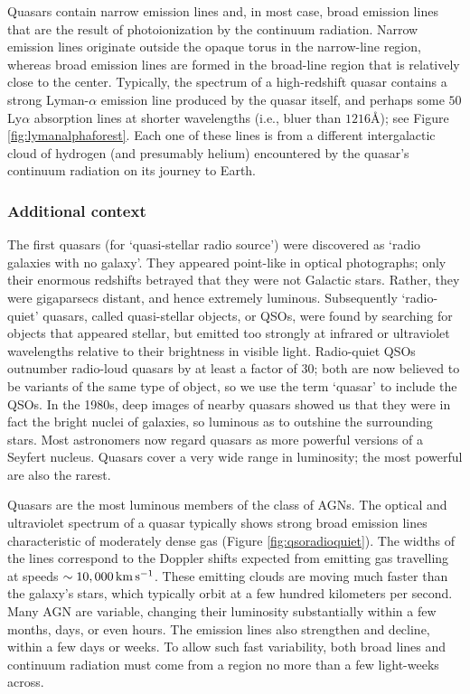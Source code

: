 \documentclass[a4paper,10pt]{article}
\begin{document}
{\noindent}Quasars contain narrow emission lines and, in most case, broad emission lines that are the result of photoionization by the continuum radiation. Narrow emission lines originate outside the opaque torus in the narrow-line region, whereas broad emission lines are formed in the broad-line region that is relatively close to the center. Typically, the spectrum of a high-redshift quasar contains a strong Lyman-$\alpha$ emission line produced by the quasar itself, and perhaps some $50$ Ly$\alpha$ absorption lines at shorter wavelengths (i.e., bluer than $1216$\AA); see Figure \ref{fig:lymanalphaforest}. Each one of these lines is from a different intergalactic cloud of hydrogen (and presumably helium) encountered by the quasar's continuum radiation on its journey to Earth.

\subsubsection{Additional context}

{\noindent}The first quasars (for `quasi-stellar radio source') were discovered as `radio galaxies with no galaxy'. They appeared point-like in optical photographs; only their enormous redshifts betrayed that they were not Galactic stars. Rather, they were gigaparsecs distant, and hence extremely luminous. Subsequently `radio-quiet' quasars, called quasi-stellar objects, or QSOs, were found by searching for objects that appeared stellar, but emitted too strongly at infrared or ultraviolet wavelengths relative to their brightness in visible light. Radio-quiet QSOs outnumber radio-loud quasars by at least a factor of 30; both are now believed to be variants of the same type of object, so we use the term `quasar' to include the QSOs. In the 1980s, deep images of nearby quasars showed us that they were in fact the bright nuclei of galaxies, so luminous as to outshine the surrounding stars. Most astronomers now regard quasars as more powerful versions of a Seyfert nucleus. Quasars cover a very wide range in luminosity; the most powerful are also the rarest.

{\noindent}Quasars are the most luminous members of the class of AGNs. The optical and ultraviolet spectrum of a quasar typically shows strong broad emission lines characteristic of moderately dense gas (Figure \ref{fig:qsoradioquiet}). The widths of the lines correspond to the Doppler shifts expected from emitting gas travelling at speeds $\sim10,000\,{\rm km\,s^{-1}}$. These emitting clouds are moving much faster than the galaxy's stars, which typically orbit at a few hundred kilometers per second. Many AGN are variable, changing their luminosity substantially within a few months, days, or even hours. The emission lines also strengthen and decline, within a few days or weeks. To allow such fast variability, both broad lines and continuum radiation must come from a region no more than a few light-weeks across.
\end{document}
